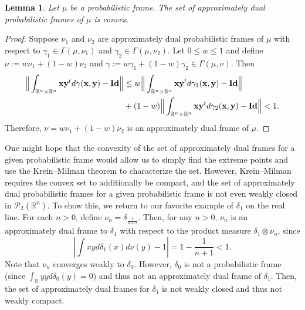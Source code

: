 \documentclass{amsart}
\numberwithin{equation}{section}
\newcommand{\bR}{\mathbb R}
\theoremstyle{plain}
\newtheorem{lemma}[theorem]{Lemma}
\theoremstyle{remark}
\theoremstyle{definition}
\begin{document}
\begin{lemma}
    Let $\mu$ be a probabilistic frame.  The set of approximately dual probabilistic frames of $\mu$ is convex.
\end{lemma}
\begin{proof}
Suppose $\nu_1$ and $ \nu_2$ are approximately dual probabilistic frames of $\mu$ with respect to $\gamma_1 \in \Gamma(\mu, \nu_1)$ and  $\gamma_2 \in \Gamma(\mu, \nu_2)$. Let $0 \leq w \leq 1$ and define $\nu := w \nu_1 + (1-w)\nu_2 $ and $ \gamma := w\gamma_1+(1-w)\gamma_2 \in \Gamma(\mu, \nu)$. Then
    \begin{equation*}
    \begin{split}
        \Big \| \int_{\mathbb{R}^n \times \mathbb{R}^n} {\bf x}{\bf y}^t d\gamma({\bf x, y}) - {\bf Id} \Big \| &\leq   w \Big \| \int_{\mathbb{R}^n \times \mathbb{R}^n} {\bf x}{\bf y}^t d\gamma_1({\bf x, y}) - {\bf Id} \Big \| \\
        & +(1-w) \Big \| \int_{\mathbb{R}^n \times \mathbb{R}^n} {\bf x}{\bf y}^t d\gamma_2({\bf x, y}) - {\bf Id} \Big \| < 1. 
    \end{split}
\end{equation*}
Therefore, $\nu = w \nu_1 + (1-w)\nu_2$ is an approximately dual frame of $\mu$. 
\end{proof}

One might hope that the convexity of the set of approximately dual frames for a given probabilistic frame would allow us to simply find the extreme points and use the Krein–Milman theorem to characterize the set.  However, Krein–Milman requires the convex set to additionally be compact, and the set of approximately dual probabilistic frames for a given probabilistic frame is not even weakly closed in $\mathcal{P}_2(\mathbb{R}^n)$. To show this, we return to our favorite example of $\delta_1$ on the real line. For each $n>0$, define $\nu_n = \delta_{\frac{1}{n+1}}$. Then, for any $n>0$, $\nu_n$ is an approximately dual frame to $\delta_1$ with respect to the product measure $\delta_1 \otimes \nu_n$, since
\begin{equation*}
    \left | \int x y d\delta_1(x)d\nu(y)  -1 \right | = 1- \frac{1}{n+1} <1.
\end{equation*}
Note that $\nu_n$ converges weakly to $\delta_0$. However,  $\delta_0$ is not a probabilistic frame (since $\int_{\bR} y y d \delta_0(y) =0$) and thus not an approximately dual frame of $\delta_1$. Then, the set of approximately dual frames for $\delta_1$ is not weakly closed and thus not weakly compact. 
\end{document}
